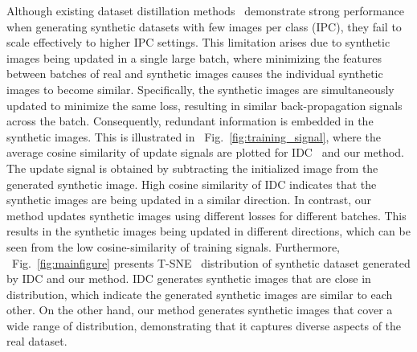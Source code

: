 \documentclass{article}
\theoremstyle{plain}
\theoremstyle{definition}
\theoremstyle{remark}
\begin{document}
Although existing dataset distillation methods~\cite{} demonstrate strong performance when generating synthetic datasets with few images per class (IPC), they fail to scale effectively to higher IPC settings. This limitation arises due to synthetic images being updated in a single large batch, where minimizing the features between batches of real and synthetic images causes the individual synthetic images to become similar. Specifically, the synthetic images are simultaneously updated to minimize the same loss, resulting in similar back-propagation signals across the batch. Consequently, redundant information is embedded in the synthetic images. This is illustrated in ~Fig.~\ref{fig:training_signal}, where the average cosine similarity of update signals are plotted for IDC~\cite{} and our method. The update signal is obtained by subtracting the initialized image from the generated synthetic image. High cosine similarity of IDC indicates that the synthetic images are being updated in a similar direction. In contrast, our method updates synthetic images using different losses for different batches. This results in the synthetic images being updated in different directions, which can be seen from the low cosine-similarity of training signals. Furthermore, ~Fig.~\ref{fig:mainfigure} presents T-SNE~\cite{} distribution of synthetic dataset generated by IDC and our method. IDC generates synthetic images that are close in distribution, which indicate the generated synthetic images are similar to each other. On the other hand, our method generates synthetic images that cover a wide range of distribution, demonstrating that it captures diverse aspects of the real dataset.

\end{document}
